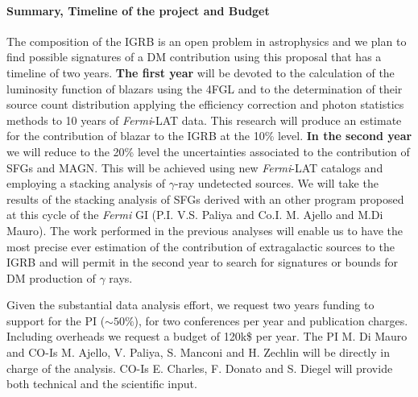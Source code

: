 \documentclass[12 pt]{article}
\newcommand{\FIXME}[1]{{\color{red}{\em Comment: }{#1}}}
\begin{document}
\vspace{-0.5cm}
\paragraph{Summary, Timeline of the project and Budget}
The composition of the IGRB is an open problem in astrophysics and we plan to find possible signatures of a DM contribution using this proposal that has a timeline of two years.  
{\bf The first year} will be devoted to the calculation of the luminosity function of blazars using the 4FGL and to the determination of their source count distribution applying the efficiency correction and photon statistics methods to 10 years of {\it Fermi}-LAT data. This research will produce an estimate for the contribution of blazar to the IGRB at the 10\% level.
{\bf In the second year} we will reduce to the 20\% level the uncertainties associated to the contribution of SFGs and MAGN. This will be achieved using new {\it Fermi}-LAT catalogs and employing a stacking analysis of $\gamma$-ray undetected sources.
We will take the results of the stacking analysis of SFGs derived with an other program proposed at this cycle of the {\it Fermi} GI (P.I. V.S. Paliya and Co.I. M. Ajello and M.Di Mauro).
The work performed in the previous analyses will enable us to have the most precise ever estimation of the contribution of extragalactic sources to the IGRB and will permit in the second year to search for signatures or bounds for DM production of $\gamma$ rays.

Given the substantial data analysis effort, we request two years funding to support for the PI ($\sim 50\%$), for two conferences per year and publication charges. Including overheads we request a budget of 120k\$ per year. 
The PI M. Di Mauro and CO-Is M. Ajello, V. Paliya, S. Manconi and H. Zechlin will be directly in charge of the analysis. CO-Is E. Charles, F. Donato and S. Diegel will provide both technical and the scientific input.



\vspace{-0.0cm}
{\footnotesize
\begin{multicols}{2}


\end{multicols}}
\end{document}
